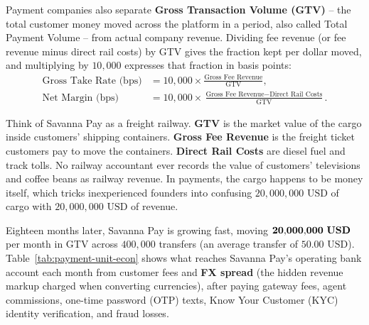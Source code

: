Payment companies also separate \textbf{Gross Transaction Volume (GTV)} -- the total customer money moved across the platform in a period, also called Total Payment Volume -- from actual company revenue. Dividing fee revenue (or fee revenue minus direct rail costs) by GTV gives the fraction kept per dollar moved, and multiplying by $10{,}000$ expresses that fraction in basis points:
\begin{align*}
  \text{Gross Take Rate (bps)} &= 10{,}000 \times \frac{\text{Gross Fee Revenue}}{\text{GTV}}, \\
  \text{Net Margin (bps)} &= 10{,}000 \times \frac{\text{Gross Fee Revenue} - \text{Direct Rail Costs}}{\text{GTV}}.
\end{align*}

\begin{intuitionbox}
Think of Savanna Pay as a freight railway. \textbf{GTV} is the market value of the cargo inside customers' shipping containers. \textbf{Gross Fee Revenue} is the freight ticket customers pay to move the containers. \textbf{Direct Rail Costs} are diesel fuel and track tolls. No railway accountant ever records the value of customers' televisions and coffee beans as railway revenue. In payments, the cargo happens to be money itself, which tricks inexperienced founders into confusing $20{,}000{,}000\text{ USD}$ of cargo with $20{,}000{,}000\text{ USD}$ of revenue.
\end{intuitionbox}

Eighteen months later, Savanna Pay is growing fast, moving $\mathbf{20{,}000{,}000\text{ \textbf{USD}}}$ per month in GTV across $400{,}000$ transfers (an average transfer of $50.00\text{ USD}$). Table~\ref{tab:payment-unit-econ} shows what reaches Savanna Pay's operating bank account each month from customer fees and \textbf{FX spread} (the hidden revenue markup charged when converting currencies), after paying gateway fees, agent commissions, one-time password (OTP) texts, Know Your Customer (KYC) identity verification, and fraud losses.

